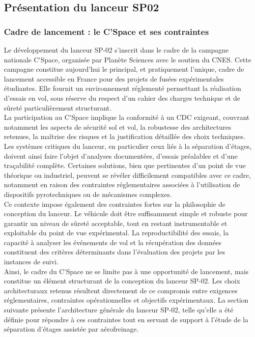 \subsection{Présentation du lanceur SP02}
\label{sec:presentation_SP02}

\subsubsection{Cadre de lancement : le C’Space et ses contraintes}

Le développement du lanceur SP-02 s’inscrit dans le cadre de la campagne nationale \gls{C'Space}, organisée par
\gls{Planète Sciences} avec le soutien du \acrfull{CNES}. Cette campagne constitue aujourd’hui le principal, et pratiquement
l’unique, cadre de lancement accessible en France pour des projets de fusées expérimentales étudiantes. Elle fournit un
environnement réglementé permettant la réalisation d’essais en vol, sous réserve du respect d’un cahier des charges technique et
de sûreté particulièrement structurant.\\

La participation au \gls{C'Space} implique la conformité à un \acrfull{CDC} exigeant, couvrant notamment les aspects de sécurité
sol et vol, la robustesse des architectures retenues, la maîtrise des risques et la justification détaillée des choix techniques.
Les systèmes critiques du lanceur, en particulier ceux liés à la séparation d’étages, doivent ainsi faire l’objet d’analyses
documentées, d’essais préalables et d’une traçabilité complète. Certaines solutions, bien que pertinentes d’un point de vue
théorique ou industriel, peuvent se révéler difficilement compatibles avec ce cadre, notamment en raison des contraintes
réglementaires associées à l’utilisation de dispositifs pyrotechniques ou de mécanismes complexes.\\

Ce contexte impose également des contraintes fortes sur la philosophie de conception du lanceur. Le véhicule doit être
suffisamment simple et robuste pour garantir un niveau de sûreté acceptable, tout en restant instrumentable et exploitable du
point de vue expérimental. La reproductibilité des essais, la capacité à analyser les événements de vol et la récupération des
données constituent des critères déterminants dans l’évaluation des projets par les instances de suivi.\\

Ainsi, le cadre du \gls{C'Space} ne se limite pas à une opportunité de lancement, mais constitue un élément structurant de la
conception du lanceur SP-02. Les choix architecturaux retenus résultent directement de ce compromis entre exigences
réglementaires, contraintes opérationnelles et objectifs expérimentaux. La section suivante présente l’architecture générale du
lanceur SP-02, telle qu’elle a été définie pour répondre à ces contraintes tout en servant de support à l’étude de la séparation
d’étages assistée par aérofreinage.

